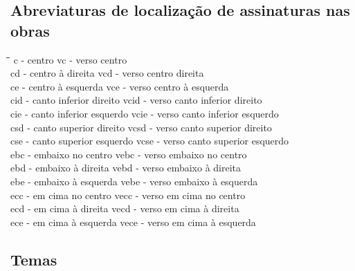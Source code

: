 \subsection{Abreviaturas de localização de assinaturas nas obras}
  	 \begin{tabbing}
  	 	\hspace{0.7cm}\=\hspace{8cm}\=\hspace{1cm}\=\kill
  	 c	\> - centro \> vc \> - verso centro \\ 
  	 cd	\> - centro à direita \> vcd \> - verso centro direita\\ 
  	 ce	\> - centro à esquerda \> vce \> - verso centro à esquerda\\
  	 cid\> - canto inferior direito\> vcid \> - verso canto inferior direito\\ 
  	 cie\> - canto inferior esquerdo \> vcie \> - verso canto inferior esquerdo\\ 
  	 csd\> - canto superior direito \> vcsd \> - verso canto superior direito\\
  	 cse\> - canto superior esquerdo \> vcse \> - verso canto superior esquerdo\\ 
  	 ebc\> - embaixo no centro \> vebc \> - verso embaixo no centro\\ 
  	 ebd\> - embaixo à direita \> vebd \> - verso embaixo à direita\\
  	 ebe\> - embaixo à esquerda\> vebe \> - verso embaixo à esquerda\\ 
  	 ecc\> - em cima no centro \> vecc \> - verso em cima no centro\\ 
  	 ecd\> - em cima à direita \> vecd \> - verso em cima à direita\\ 
  	 ece\> - em cima à esquerda \> vece \> - verso em cima à esquerda
  	 \end{tabbing} 	
 	
\subsection{Temas}

